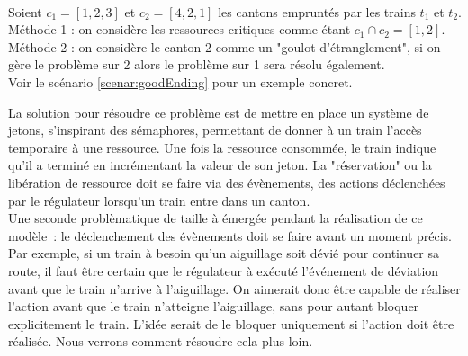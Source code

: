 \documentclass[oneside, a4paper, 11pt]{book}
\begin{document}
\begin{example}
	~\\
	Soient $c_1 = [1,2,3]$ et $c_2 = [4,2,1]$ les cantons empruntés par les trains $t_1$ et $t_2$.
	\\Méthode 1 : on considère les ressources critiques comme étant $c_1 \cap c_2 = [1,2]$.
	\\Méthode 2 : on considère le canton 2 comme un "goulot d'étranglement", si on gère le problème sur 2 alors le problème sur 1 sera résolu également.
	\\Voir le scénario \ref{scenar:goodEnding} pour un exemple concret.
\end{example}
\noindent
La solution pour résoudre ce problème est de mettre en place un système de jetons, s'inspirant des sémaphores, permettant de donner à un train l'accès temporaire à une ressource.
Une fois la ressource consommée, le train indique qu'il a terminé en incrémentant la valeur de son jeton. 
La "réservation" ou la libération de ressource doit se faire via des évènements, des actions déclenchées par le régulateur lorsqu'un train entre dans un canton.
\\Une seconde problèmatique de taille à émergée pendant la réalisation de ce modèle~: le déclenchement des évènements doit se faire avant un moment précis.
Par exemple, si un train à besoin qu'un aiguillage soit dévié pour continuer sa route, il faut être certain que le régulateur à exécuté l'événement de déviation avant que le train n'arrive à l'aiguillage.
On aimerait donc être capable de réaliser l'action avant que le train n'atteigne l'aiguillage, sans pour autant bloquer explicitement le train. L'idée serait de le bloquer uniquement si l'action doit être réalisée.
Nous verrons comment résoudre cela plus loin.
\end{document}

